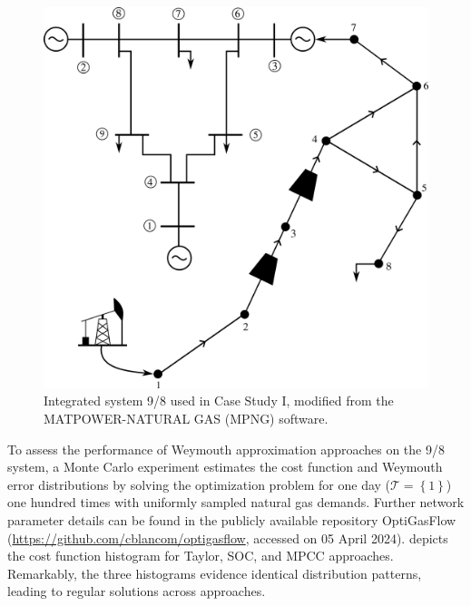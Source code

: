 \begin{figure}[h]
    \centering
    \includegraphics[scale=0.6]{figures/Chapter_MPCC/8 node 9 bus network.png}
    \caption{Integrated system 9/8 used in Case Study I, modified from the MATPOWER-NATURAL GAS (MPNG) software.}
    \label{fig:8-9 network}
\end{figure}

To assess the performance of Weymouth approximation approaches on the 9/8 system, a Monte Carlo experiment estimates the cost function and Weymouth error distributions by solving the optimization problem for one day ($\mathcal{T}=\left\lbrace 1\right\rbrace$) one hundred times with uniformly sampled natural gas demands. Further network parameter details can be found in the publicly available repository OptiGasFlow ({\url{https://github.com/cblancom/optigasflow}}, accessed on 05 April 2024). 
  depicts the cost function histogram for Taylor, SOC, and MPCC approaches. Remarkably, the three histograms evidence identical distribution patterns, leading to regular solutions across approaches.

